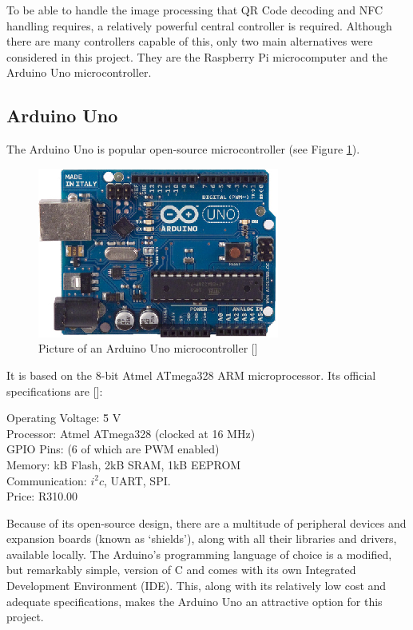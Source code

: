 To be able to handle the image processing that QR Code decoding and NFC handling requires, a
relatively powerful central controller is required. Although there are many controllers capable
of this, only two main alternatives were considered in this project. They are the Raspberry Pi microcomputer and
the Arduino Uno microcontroller.

\subsection{Arduino Uno}

The Arduino Uno is popular open-source microcontroller (see Figure \ref{fig:arduino}). 

\begin{figure}[h]
\centering
\includegraphics[scale=1.5]{arduino.eps}
\caption[Picture of an Arduino Uno microcontroller]{Picture of an Arduino Uno microcontroller
[\cite{manual:arduino-specs}]}
\label{fig:arduino}
\end{figure}

It is
based on the 8-bit Atmel ATmega328 ARM microprocessor. Its official specifications are [\cite{website:arduino-specs}]:

\begin{tabbing}

Operating Voltage: \= 5 V \\ 
Processor: \> Atmel ATmega328 (clocked at 16 MHz) \\
GPIO Pins:  (6 of which are PWM enabled) \\
Memory:  kB Flash, 2kB SRAM, 1kB EEPROM \\
Communication: \> $i^2c$, UART, SPI. \\
Price: \> R310.00 \\

\end{tabbing}

Because of its open-source design, there are a multitude of peripheral devices and expansion
boards (known as `shields'), along with all their libraries and drivers, available locally. The
Arduino's programming language of choice is a modified, but remarkably simple, version of C
and comes with its own Integrated Development Environment (IDE). This, along with its relatively low cost and adequate
specifications, makes the Arduino Uno an attractive option for this project.

